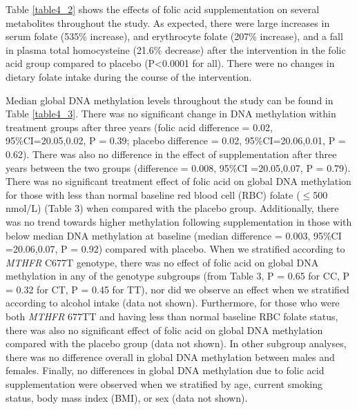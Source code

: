 \noindent Table \ref{table4_2} shows the effects of folic acid supplementation on several metabolites throughout the study. As expected, there were large increases in serum folate (535\% increase), and erythrocyte folate (207\% increase), and a fall in plasma total homocysteine (21.6\% decrease) after the intervention in the folic acid group compared to placebo (P<0.0001 for all). There were no changes in dietary folate intake during the course of the intervention.

\noindent Median global DNA methylation levels throughout the study can be found in Table \ref{table4_3}. There was no significant change in DNA methylation within treatment groups after three years (folic acid difference = 0.02, 95\%CI=20.05,0.02, P = 0.39; placebo difference = 0.02, 95\%CI=20.06,0.01, P = 0.62). There was also no difference in the effect of supplementation after three years between the two groups (difference = 0.008, 95\%CI =20.05,0.07, P = 0.79). There was no significant treatment effect of folic acid on global DNA methylation for those with less than normal baseline red blood cell (RBC) folate ($\leq$500 nmol/L) (Table 3) when compared with the placebo group. Additionally, there was no trend towards higher methylation following supplementation in those with below median DNA methylation at baseline (median difference = 0.003, 95\%CI =20.06,0.07, P = 0.92) compared with placebo. When we stratified according to \emph{MTHFR} C677T genotype, there was no effect of folic acid on global DNA 
methylation in any of the genotype subgroups (from Table 3, P = 0.65 for CC, P = 0.32 for CT, P = 0.45 for TT), nor did we observe an effect when we stratified according to alcohol intake (data not shown). Furthermore, for those who were both \emph{MTHFR} 677TT and having less than normal baseline RBC folate status, there was also no significant effect of folic acid on global DNA methylation compared with the placebo group (data not shown). In other subgroup analyses, there was no difference overall in global DNA methylation between males and females. Finally, no differences in global DNA methylation due to folic acid supplementation were observed when we stratified by age, current smoking status, body mass index (BMI), or sex (data not shown).


